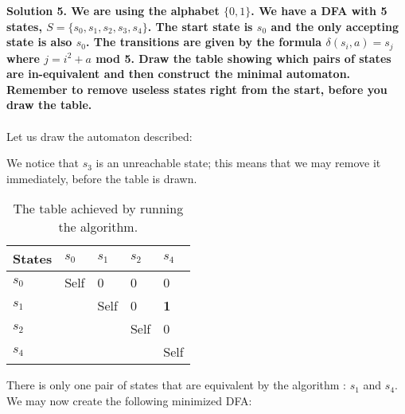 \documentclass{article}
\begin{document}
\noindent \textbf{Solution 5. We are using the alphabet \(\{0,1\}\). We have a DFA with 5 states, \(S = \{s_0, s_1, s_2, s_3, s_4\}\). The start state is \(s_0\) and the only accepting state is also \(s_0\). The transitions are given by the formula \(\delta(s_i,a) = s_j\) where \(j=i^2+a\) mod 5. Draw the table showing which pairs of states are in-equivalent and then construct the minimal automaton. Remember to remove useless states right from the start, before you draw the table.}
\\\\
\noindent Let us draw the automaton described:


\begin{figure}[h]
   \centering
\end{figure}
\noindent We notice that \(s_3\) is an unreachable state; this means that we may remove it immediately, before the table is drawn.\\

\begin{table}[h!]
    \centering
    \begin{tabular}{ |p{3cm}|p{3cm}|p{3cm}|p{3cm}|p{3cm}|}
    \hline
    
        States & \textbf{\(s_0\)} & \textbf{\(s_1\)} & \textbf{\(s_2\)}& \textbf{\(s_4\)}\\
        \hline
        \hline
        \(s_0\)  & Self   & 0   &  0  & 0\\
        \hline
        \(s_1\)&     & Self   & 0 & \textbf{1}\\
        \hline
        \(s_2\)&   & & Self   & 0\\
        \hline 
        \(s_4\)  &   &    &  & Self\\
        \hline
\end{tabular}
    \caption{The table achieved by running the algorithm.}
    \label{tab:my_label}
\end{table}
\noindent There is only one pair of states that are equivalent by the algorithm : \(s_1\) and \(s_4\). We may now create the following minimized DFA:
\end{document}

